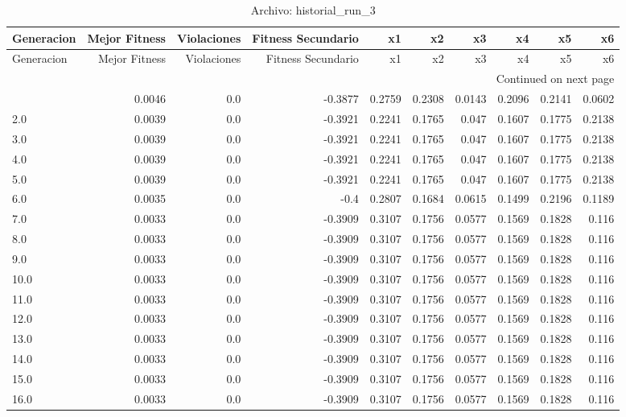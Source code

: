 \begin{longtable}{lrrrrrrrrr}
\caption{Archivo: historial\_run\_3}\label{tab:historial_run_3} \\
\toprule
Generacion & Mejor Fitness & Violaciones & Fitness Secundario & x1 & x2 & x3 & x4 & x5 & x6 \\
\midrule
\endfirsthead
\toprule
Generacion & Mejor Fitness & Violaciones & Fitness Secundario & x1 & x2 & x3 & x4 & x5 & x6 \\
\midrule
\endhead
\midrule
\multicolumn{10}{r}{Continued on next page} \\
\midrule
\endfoot
\bottomrule
\endlastfoot
1.0 & 0.0046 & 0.0 & -0.3877 & 0.2759 & 0.2308 & 0.0143 & 0.2096 & 0.2141 & 0.0602 \\
2.0 & 0.0039 & 0.0 & -0.3921 & 0.2241 & 0.1765 & 0.047 & 0.1607 & 0.1775 & 0.2138 \\
3.0 & 0.0039 & 0.0 & -0.3921 & 0.2241 & 0.1765 & 0.047 & 0.1607 & 0.1775 & 0.2138 \\
4.0 & 0.0039 & 0.0 & -0.3921 & 0.2241 & 0.1765 & 0.047 & 0.1607 & 0.1775 & 0.2138 \\
5.0 & 0.0039 & 0.0 & -0.3921 & 0.2241 & 0.1765 & 0.047 & 0.1607 & 0.1775 & 0.2138 \\
6.0 & 0.0035 & 0.0 & -0.4 & 0.2807 & 0.1684 & 0.0615 & 0.1499 & 0.2196 & 0.1189 \\
7.0 & 0.0033 & 0.0 & -0.3909 & 0.3107 & 0.1756 & 0.0577 & 0.1569 & 0.1828 & 0.116 \\
8.0 & 0.0033 & 0.0 & -0.3909 & 0.3107 & 0.1756 & 0.0577 & 0.1569 & 0.1828 & 0.116 \\
9.0 & 0.0033 & 0.0 & -0.3909 & 0.3107 & 0.1756 & 0.0577 & 0.1569 & 0.1828 & 0.116 \\
10.0 & 0.0033 & 0.0 & -0.3909 & 0.3107 & 0.1756 & 0.0577 & 0.1569 & 0.1828 & 0.116 \\
11.0 & 0.0033 & 0.0 & -0.3909 & 0.3107 & 0.1756 & 0.0577 & 0.1569 & 0.1828 & 0.116 \\
12.0 & 0.0033 & 0.0 & -0.3909 & 0.3107 & 0.1756 & 0.0577 & 0.1569 & 0.1828 & 0.116 \\
13.0 & 0.0033 & 0.0 & -0.3909 & 0.3107 & 0.1756 & 0.0577 & 0.1569 & 0.1828 & 0.116 \\
14.0 & 0.0033 & 0.0 & -0.3909 & 0.3107 & 0.1756 & 0.0577 & 0.1569 & 0.1828 & 0.116 \\
15.0 & 0.0033 & 0.0 & -0.3909 & 0.3107 & 0.1756 & 0.0577 & 0.1569 & 0.1828 & 0.116 \\
16.0 & 0.0033 & 0.0 & -0.3909 & 0.3107 & 0.1756 & 0.0577 & 0.1569 & 0.1828 & 0.116 \\

\end{longtable}
